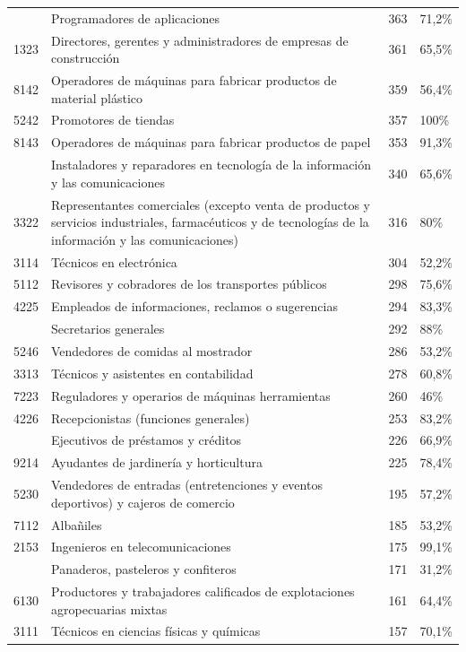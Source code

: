 \documentclass[
  11pt,
]{article}
\begin{document}
\begin{longtable}{r>{\raggedright\arraybackslash}p{9cm}rl}
\addlinespace
2514 & Programadores de aplicaciones & 363 & 71,2\%\\
1323 & Directores, gerentes y administradores de empresas de construcción & 361 & 65,5\%\\
8142 & Operadores de máquinas para fabricar productos de material plástico & 359 & 56,4\%\\
5242 & Promotores de tiendas & 357 & 100\%\\
8143 & Operadores de máquinas para fabricar productos de papel & 353 & 91,3\%\\
\addlinespace
7422 & Instaladores y reparadores en tecnología de la información y las comunicaciones & 340 & 65,6\%\\
3322 & Representantes comerciales (excepto venta de productos y servicios industriales, farmacéuticos y de tecnologías de la información y las comunicaciones) & 316 & 80\%\\
3114 & Técnicos en electrónica & 304 & 52,2\%\\
5112 & Revisores y cobradores de los transportes públicos & 298 & 75,6\%\\
4225 & Empleados de informaciones, reclamos o sugerencias & 294 & 83,3\%\\
\addlinespace
4120 & Secretarios generales & 292 & 88\%\\
5246 & Vendedores de comidas al mostrador & 286 & 53,2\%\\
3313 & Técnicos y asistentes en contabilidad & 278 & 60,8\%\\
7223 & Reguladores y operarios de máquinas herramientas & 260 & 46\%\\
4226 & Recepcionistas (funciones generales) & 253 & 83,2\%\\
\addlinespace
3312 & Ejecutivos de préstamos y créditos & 226 & 66,9\%\\
9214 & Ayudantes de jardinería y horticultura & 225 & 78,4\%\\
5230 & Vendedores de entradas (entretenciones y eventos deportivos) y cajeros de comercio & 195 & 57,2\%\\
7112 & Albañiles & 185 & 53,2\%\\
2153 & Ingenieros en telecomunicaciones & 175 & 99,1\%\\
\addlinespace
7512 & Panaderos, pasteleros y confiteros & 171 & 31,2\%\\
6130 & Productores y trabajadores calificados de explotaciones agropecuarias mixtas & 161 & 64,4\%\\
3111 & Técnicos en ciencias físicas y químicas & 157 & 70,1\%\\

\end{longtable}
\end{document}
